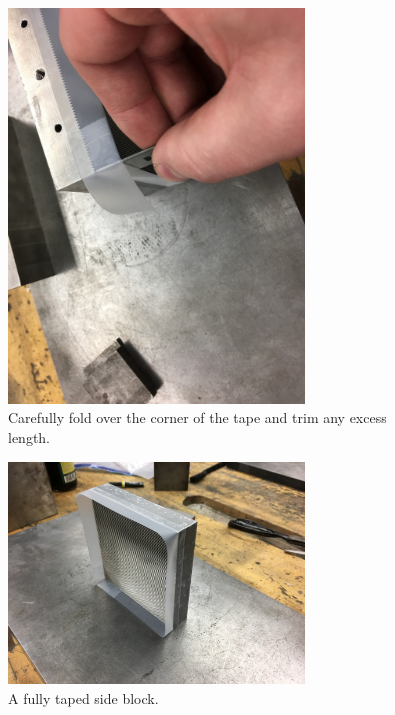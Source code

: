 \begin{figure}
	\centering
        \includegraphics[width=0.7\textwidth]{appendix_sample_prep/dds_wrap_trim.jpg}
   	\caption{Carefully fold over the corner of the tape and trim any excess length.}
  	\label{Fig:dds_wrap_trim}
\end{figure}

\clearpage

\begin{figure}
	\centering
        \includegraphics[width=0.7\textwidth]{appendix_sample_prep/dds_two_tape_layers.jpg}
   	\caption{A fully taped side block.}
  	\label{Fig:dds_two_tape_layers}
\end{figure}

